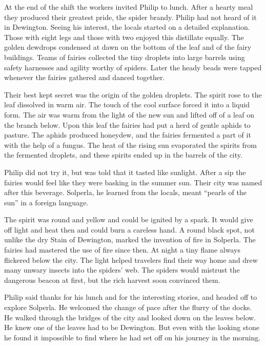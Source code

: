 \documentclass[10pt, draft]{memoir}
\begin{document}
At the end of the shift the workers invited Philip to lunch. After a hearty
meal they produced their greatest pride, the spider brandy. Philip had not
heard of it in Dewington. Seeing his interest, the locals started on a detailed
explanation. Those with eight legs and those with two enjoyed this distillate
equally. The golden dewdrops condensed at dawn on the bottom of the leaf and of
the fairy buildings. Teams of fairies collected the tiny droplets into large
barrels using safety harnesses and agility worthy of spiders. Later the heady
beads were tapped whenever the fairies gathered and danced together.

Their best kept secret was the origin of the golden droplets. The spirit rose
to the leaf dissolved in warm air. The touch of the cool surface forced it into
a liquid form. The air was warm from the light of the new sun and lifted off of
a leaf on the branch below. Upon this leaf the fairies had put a herd of gentle
aphids to pasture. The aphids produced honeydew, and the fairies fermented a
part of it with the help of a fungus. The heat of the rising sun evaporated the
spirits from the fermented droplets, and these spirits ended up in the barrels
of the city.

Philip did not try it, but was told that it tasted like sunlight. After a sip
the fairies would feel like they were basking in the summer sun. Their city was
named after this beverage. Solperla, he learned from the locals, meant ``pearls
of the sun'' in a foreign language.

The spirit was round and yellow and could be ignited by a spark. It would give
off light and heat then and could burn a careless hand. A round black spot,
not unlike the dry Stain of Dewington, marked the invention of fire in
Solperla.  The fairies had mastered the use of fire since then. At night a tiny
flame always flickered below the city. The light helped travelers find their
way home and drew many unwary insects into the spiders' web. The spiders would
mistrust the dangerous beacon at first, but the rich harvest soon convinced
them.

Philip said thanks for his lunch and for the interesting stories, and headed
off to explore Solperla. He welcomed the change of pace after the flurry of the
docks. He walked through the bridges of the city and looked down on the leaves
below. He knew one of the leaves had to be Dewington. But even with the looking
stone he found it impossible to find where he had set off on his journey in the
morning.
\end{document}
